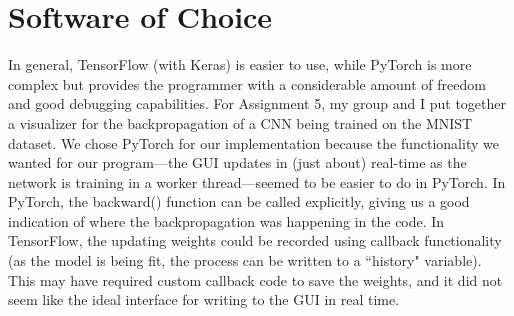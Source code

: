\documentclass[conference]{IEEEtran}
\begin{document}
\section{Software of Choice}
In general, TensorFlow (with Keras) is easier to use, while PyTorch is more complex but provides the programmer with a considerable amount of freedom and good debugging capabilities. For Assignment 5, my group and I put together a visualizer for the backpropagation of a CNN being trained on the MNIST dataset. We chose PyTorch for our implementation because the functionality we wanted for our program---the GUI updates in (just about) real-time as the network is training in a worker thread---seemed to be easier to do in PyTorch. In PyTorch, the backward() function can be called explicitly, giving us a good indication of where the backpropagation was happening in the code. In TensorFlow, the updating weights could be recorded using callback functionality (as the model is being fit, the process can be written to a ``history" variable). This may have required custom callback code to save the weights, and it did not seem like the ideal interface for writing to the GUI in real time.

\end{document}
